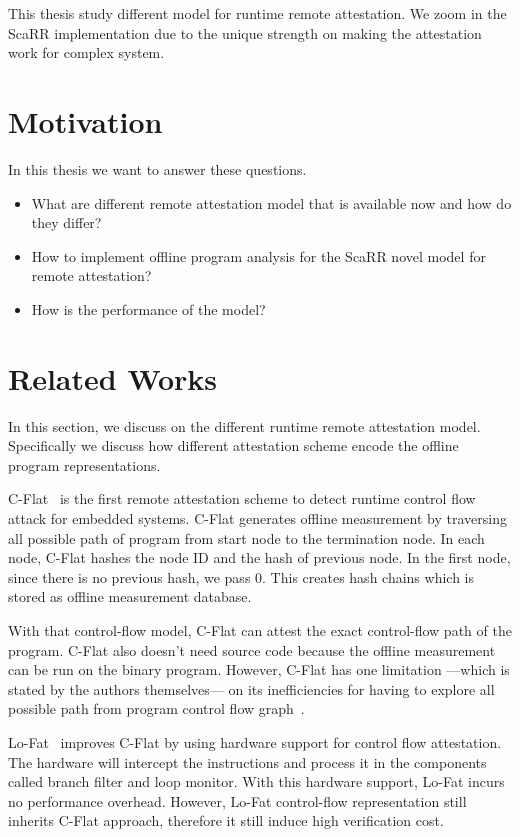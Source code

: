 This thesis study different model for runtime remote attestation. We zoom in the
ScaRR implementation due to the unique strength on making the attestation work
for complex system.

\section{Motivation}

In this thesis we want to answer these questions.
\begin{itemize}
    \item What are different remote attestation model that is available now and
    how do they differ?
    \item How to implement offline program analysis for the ScaRR novel model
    for remote attestation?
    \item How is the performance of the model?
\end{itemize}

\section{Related Works}

In this section, we discuss on the different runtime remote attestation
model. Specifically we discuss how different attestation scheme encode the
offline program representations.

C-Flat~\cite{aberaCFLATControlFlowAttestation2016} is the first remote
attestation scheme to detect runtime control flow attack for embedded systems.
C-Flat generates offline measurement by traversing all possible path of program
from start node to the termination node. In each node, C-Flat hashes the node ID
and the hash of previous node. In the first node, since there is no previous
hash, we pass 0. This creates hash chains which is stored as offline measurement
database.

With that control-flow model, C-Flat can attest the exact control-flow path of
the program. C-Flat also doesn't need source code because the offline
measurement can be run on the binary program. However, C-Flat has one limitation
---which is stated by the authors themselves--- on its inefficiencies for having
to explore all possible path from program control flow
graph~\cite{aberaCFLATControlFlowAttestation2016}.

Lo-Fat~\cite{dessoukyLOFATLowOverheadControl2017} improves C-Flat by using
hardware support for control flow attestation. The hardware will intercept the
instructions and process it in the components called branch filter and loop
monitor. With this hardware support, Lo-Fat incurs no performance overhead.
However, Lo-Fat control-flow representation still inherits C-Flat approach,
therefore it still induce high verification cost.

